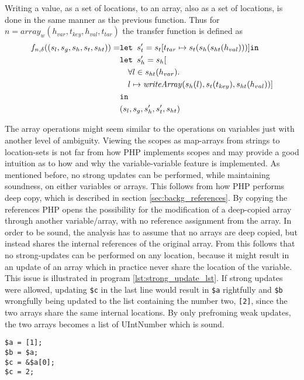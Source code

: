 Writing a value, as a set of locations, to an array, also as a set of locations, is done in the same manner as the previous function. Thus for  $n = \mathit{array}_w(h_{var}, t_{key},h_{val},t_{tar})$ the transfer function is defined as 
\begin{align}
    f_{n,\delta}((s_l, s_g, s_h, s_t, s_{ht})) = &\texttt{let } s_t' = s_t[t_{tar}\mapsto s_t(s_h(s_{ht}(h_{val})))] \texttt{in }\notag\\
                              &\texttt{let } s_h' = s_h[\notag\\
                              &\quad \forall l \in s_{ht}(h_{var}).\notag\\
                              &\quad l\mapsto \mathit{writeArray}(s_h(l), s_t(t_{key}), s_{ht}(h_{val}))]\notag\\
                              & \texttt{in }\notag\\
                              &(s_l, s_g, s_h', s_t', s_{ht})
\end{align}

The array operations might seem similar to the operations on variables just with another level of ambiguity. Viewing the scopes as map-arrays from strings to location-sets is not far from how PHP implements scopes and may provide a good intuition as to how and why the variable-variable feature is implemented. As mentioned before, no strong updates can be performed, while maintaining soundness, on either variables or arrays. This follows from how PHP performs deep copy, which is described in section \ref{sec:backg_references}. By copying the references PHP opens the possibility for the modification of a deep-copied array through another variable/array, with no reference assignment from the array.  In order to be sound, the analysis has to assume that no arrays are deep copied, but instead shares the internal references of the original array. From this follows that no strong-updates can be performed on any location, because it might result in an update of an array which in practice never share the location of the variable. This issue is illustrated in program \ref{lst:strong_update_lst}. If strong updates were allowed, updating \texttt{\$c} in the last line would result in \texttt{\$a} rightfully and \texttt{\$b} wrongfully being updated to the list containing the number two, \texttt{[2]}, since the two arrays share the same internal locations. By only prefroming weak updates, the two arrays becomes a list of { UIntNumber} which is sound.
\begin{program}
\centering
\begin{lstlisting}
$a = [1];
$b = $a;
$c = &$a[0];
$c = 2;
\end{lstlisting}
\caption{  }
\label{lst:strong_update_lst}
\end{program}

